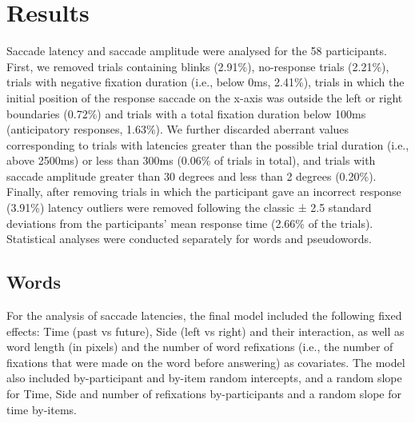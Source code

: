 \documentclass[
  a4paper,12pt,twoside,onecolumn,openright,final,oldfontcommands]{memoir}
\begin{document}
\hypertarget{results-3}{%
\section{Results}\label{results-3}}

Saccade latency and saccade amplitude were analysed for the 58 participants. First, we removed trials containing blinks (2.91\%), no-response trials (2.21\%), trials with negative fixation duration (i.e., below 0ms, 2.41\%), trials in which the initial position of the response saccade on the x-axis was outside the left or right boundaries (0.72\%) and trials with a total fixation duration below 100ms (anticipatory responses, 1.63\%). We further discarded aberrant values corresponding to trials with latencies greater than the possible trial duration (i.e., above 2500ms) or less than 300ms (0.06\% of trials in total), and trials with saccade amplitude greater than 30 degrees and less than 2 degrees (0.20\%). Finally, after removing trials in which the participant gave an incorrect response (3.91\%) latency outliers were removed following the classic ± 2.5 standard deviations from the participants' mean response time (2.66\% of the trials). Statistical analyses were conducted separately for words and pseudowords.

\hypertarget{words-3}{%
\subsection{Words}\label{words-3}}

For the analysis of saccade latencies, the final model included the following fixed effects: Time (past vs future), Side (left vs right) and their interaction, as well as word length (in pixels) and the number of word refixations (i.e., the number of fixations that were made on the word before answering) as covariates. The model also included by-participant and by-item random intercepts, and a random slope for Time, Side and number of refixations by-participants and a random slope for time by-items.
\end{document}
